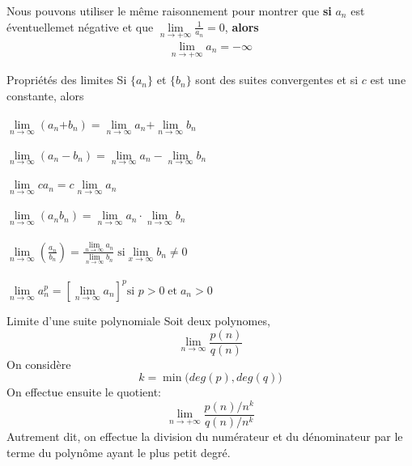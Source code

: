 \documentclass[16pt]{report}
\begin{document}
\begin{multicols*}{2}
    \begin{note}{}{}
        Nous pouvons utiliser le même raisonnement pour montrer que 
        \textbf{si} $a_n$ est éventuellemet négative et que 
        $\lim\limits_{n\to+\infty}\frac{1}{a_n}  = 0$, \textbf{alors}  
        \begin{align*}
            \lim\limits_{n\to+\infty}a_n  = -\infty 
        \end{align*}
    \end{note}


    \begin{Concept}{Propriétés des limites}{}
        Si $\{a_n\}$ et $\{b_n\}$ sont des suites convergentes et 
        si $c$ est une constante, alors \\\\ 
        $\lim\limits_{n\to\infty  }\left(a_n \text{+} b_n \right) = 
        \lim\limits_{n\to\infty  }a_n \text{+} 
        \lim\limits_{n\to\infty  }b_n$
        \\\\
        $\lim\limits_{n\to\infty  }\left(a_n - b_n \right) = 
        \lim\limits_{n\to\infty  }a_n - \lim\limits_{n\to\infty  }b_n$ 
        \\\\
        $\lim\limits_{n\to\infty  }ca_n = c \lim\limits_{n \to \infty  }a_n$ 
        \\\\
        $\lim\limits_{n\to\infty  }\left(a_nb_n \right) = 
        \lim\limits_{n\to\infty  }a_n \cdot \lim\limits_{n\to\infty  }b_n$
        \\\\
        $\lim\limits_{n\to\infty  }\left(\frac{a_n}{b_n} \right) = 
        \frac{\lim\limits_{n\to\infty  }a_n}{\lim\limits_{n\to\infty  }b_n}
        \;
        \text{si} \lim\limits_{x\to\infty  }b_n \neq 0$
        \\\\
        $\lim\limits_{n\to\infty  }a_n^{p} = 
        \left[\lim\limits_{n\to\infty  }a_n \right]^p \text{si } 
        p > 0 \; \text{et} \; a_n > 0$
    \end{Concept}


    \begin{Concept}{Limite d'une suite polynomiale}{}
        \noindent Soit deux polynomes,
        \[ \lim\limits_{n\to \infty } \dfrac{p(n)}{q(n)}\] 
        On considère 
        \[ k = \min\bigl(deg(p), deg(q)\bigr) \]
        On effectue ensuite le quotient: 
        \[ \lim\limits_{n\to+\infty}\dfrac{p(n)/{n^k}}{q(n)/n^{k}} \]
        Autrement dit, on effectue la division du numérateur et du 
        dénominateur par le terme du polynôme ayant le plus petit degré. 
    \end{Concept}


\end{multicols*}
\end{document}
